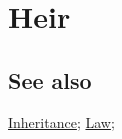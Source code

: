 \section{Heir}
	\label{HEIR}
	
\subsection{See also}

	\hyperref[INHERITANCE]{Inheritance}; \hyperref[LAW]{Law}; 




	

	

